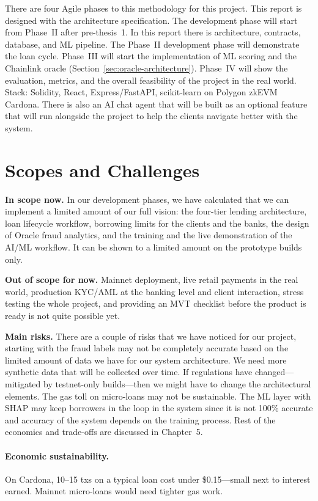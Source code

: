 \documentclass[12pt,a4paper]{report}
\begin{document}
There are four Agile phases to this methodology for this project. This report is designed with the architecture specification. The development phase will start from Phase~II after pre-thesis~1. In this report there is architecture, contracts, database, and ML pipeline. The Phase~II development phase will demonstrate the loan cycle. Phase~III will start the implementation of ML scoring and the Chainlink oracle (Section~\ref{sec:oracle-architecture}). Phase~IV will show the evaluation, metrics, and the overall feasibility of the project in the real world. Stack: Solidity, React, Express/FastAPI, scikit-learn on Polygon zkEVM Cardona. There is also an AI chat agent that will be built as an optional feature that will run alongside the project to help the clients navigate better with the system.

\section{Scopes and Challenges}
\label{sec:scopes-challenges}

\textbf{In scope now.} In our development phases, we have calculated that we can implement a limited amount of our full vision: the four-tier lending architecture, loan lifecycle workflow, borrowing limits for the clients and the banks, the design of Oracle fraud analytics, and the training and the live demonstration of the AI/ML workflow. It can be shown to a limited amount on the prototype builds only.

\textbf{Out of scope for now.} Mainnet deployment, live retail payments in the real world, production KYC/AML at the banking level and client interaction, stress testing the whole project, and providing an MVT checklist before the product is ready is not quite possible yet.

\textbf{Main risks.} There are a couple of risks that we have noticed for our project, starting with the fraud labels may not be completely accurate based on the limited amount of data we have for our system architecture. We need more synthetic data that will be collected over time. If regulations have changed---mitigated by testnet-only builds---then we might have to change the architectural elements. The gas toll on micro-loans may not be sustainable. The ML layer with SHAP may keep borrowers in the loop in the system since it is not 100\% accurate and accuracy of the system depends on the training process. Rest of the economics and trade-offs are discussed in Chapter~5.

\paragraph{Economic sustainability.} On Cardona, 10--15 txs on a typical loan cost under \$0.15---small next to interest earned. Mainnet micro-loans would need tighter gas work.
\end{document}
